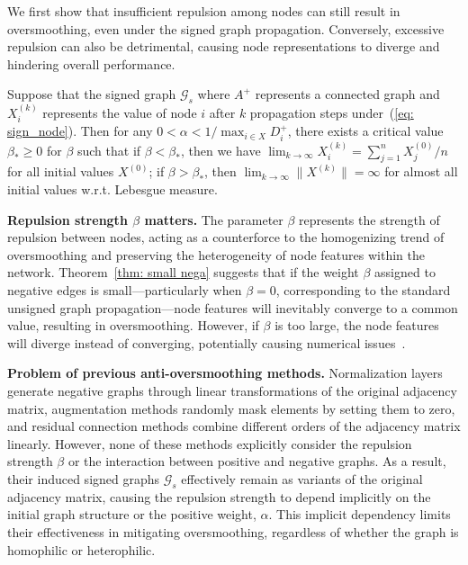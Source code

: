 We first show that insufficient repulsion among nodes can still result in oversmoothing, even under the signed graph propagation. Conversely, excessive repulsion can also be detrimental, causing node representations to diverge and hindering overall performance.
\begin{theorem}%
\label{thm: small nega}
    Suppose that the signed graph \(\mathcal{G}_s\) where $A^+$ represents a connected graph and $X_i^{(k)} $ represents the value of node $i$ after $k$ propagation steps under~(\ref{eq: sign_node}). Then 
    for any \(0 < \alpha < 1/\max_{i \in X} D_i^+\), there exists a critical value \(\beta_* \geq 0\) for \(\beta\) such that if \(\beta < \beta_*\), then we have \(\lim_{k \to \infty} X_i^{(k)} = \sum_{j=1}^n X_j^{(0)}/n\) for all initial values \(X^{(0)}\); if \(\beta > \beta_*\), then \(\lim_{k \to \infty} \|X^{(k)}\| = \infty\) for almost all initial values w.r.t. Lebesgue measure.
\end{theorem}
\textbf{Repulsion strength $\beta$ matters.} The parameter $\beta$ represents the strength of repulsion between nodes, acting as a counterforce to the homogenizing trend of oversmoothing and preserving the heterogeneity of node features within the network. Theorem~\ref{thm: small nega} suggests that if the weight $\beta$ assigned to negative edges is small---particularly when $\beta=0$, corresponding to the standard unsigned graph propagation---node features will inevitably converge to a common value, resulting in oversmoothing. 
However, if $\beta$ is too large, the node features will diverge instead of converging, potentially causing numerical issues~\cite{acmp}.


\textbf{Problem of previous anti-oversmoothing methods.} 
Normalization layers generate negative graphs through linear transformations of the original adjacency matrix, augmentation methods randomly mask elements by setting them to zero, and residual connection methods combine different orders of the adjacency matrix linearly. 
However, none of these methods explicitly consider the repulsion strength \(\beta\) or the interaction between positive and negative graphs.
As a result, their induced signed graphs \(\mathcal{G}_s\) effectively remain as variants of the original adjacency matrix, causing the repulsion strength to depend implicitly on the initial graph structure or the positive weight, $\alpha$. 
This implicit dependency limits their effectiveness in mitigating oversmoothing, regardless of whether the graph is homophilic or heterophilic.

